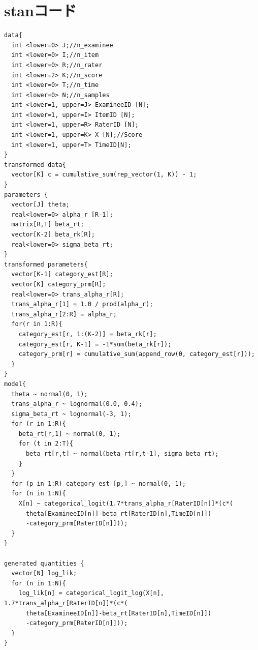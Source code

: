 \documentclass[a4paper,11pt,oneside,openany]{jsbook}
\begin{document}
\chapter{stanコード}
\begin{lstlisting}[basicstyle=\ttfamily\footnotesize, frame=single]
data{
  int <lower=0> J;//n_examinee
  int <lower=0> I;//n_item
  int <lower=0> R;//n_rater
  int <lower=2> K;//n_score
  int <lower=0> T;//n_time
  int <lower=0> N;//n_samples
  int <lower=1, upper=J> ExamineeID [N];
  int <lower=1, upper=I> ItemID [N];
  int <lower=1, upper=R> RaterID [N];
  int <lower=1, upper=K> X [N];//Score
  int <lower=1, upper=T> TimeID[N];
}
transformed data{
  vector[K] c = cumulative_sum(rep_vector(1, K)) - 1;
}
parameters {
  vector[J] theta;
  real<lower=0> alpha_r [R-1];
  matrix[R,T] beta_rt;
  vector[K-2] beta_rk[R];
  real<lower=0> sigma_beta_rt;
}
transformed parameters{
  vector[K-1] category_est[R];
  vector[K] category_prm[R];
  real<lower=0> trans_alpha_r[R];
  trans_alpha_r[1] = 1.0 / prod(alpha_r);
  trans_alpha_r[2:R] = alpha_r;
  for(r in 1:R){
    category_est[r, 1:(K-2)] = beta_rk[r];
    category_est[r, K-1] = -1*sum(beta_rk[r]);
    category_prm[r] = cumulative_sum(append_row(0, category_est[r]));
  }
}
model{
  theta ~ normal(0, 1);
  trans_alpha_r ~ lognormal(0.0, 0.4);
  sigma_beta_rt ~ lognormal(-3, 1);
  for (r in 1:R){
    beta_rt[r,1] ~ normal(0, 1);
    for (t in 2:T){
      beta_rt[r,t] ~ normal(beta_rt[r,t-1], sigma_beta_rt);
    }
  }
  for (p in 1:R) category_est [p,] ~ normal(0, 1);
  for (n in 1:N){
    X[n] ~ categorical_logit(1.7*trans_alpha_r[RaterID[n]]*(c*(
      theta[ExamineeID[n]]-beta_rt[RaterID[n],TimeID[n]])
      -category_prm[RaterID[n]]));
  }
}

generated quantities {
  vector[N] log_lik;
  for (n in 1:N){
    log_lik[n] = categorical_logit_log(X[n], 1.7*trans_alpha_r[RaterID[n]]*(c*(
      theta[ExamineeID[n]]-beta_rt[RaterID[n],TimeID[n]])
      -category_prm[RaterID[n]]));
  }
}

\end{lstlisting}
\newpage



\end{document}
